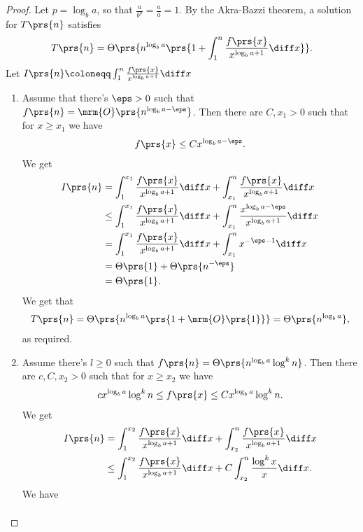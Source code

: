 \documentclass[oneside]{scrbook}
\theoremstyle{definition}
\begin{document}
\begin{exercise}
\begin{proof}
Let $p = \log_b a$, so that $\frac{a}{b^p} = \frac{a}{a} = 1$. By the Akra-Bazzi theorem, a solution for $T\prs{n}$ satisfies
\begin{align*}
T\prs{n} = \Theta\prs{n^{\log_b a} \prs{1 + \int_1^n \frac{f\prs{x}}{x^{\log_b a + 1}} \diff x}} \text{.}
\end{align*}
Let $I\prs{n} \coloneqq \int_1^n \frac{f\prs{x}}{x^{\log_b a + 1}} \diff x$
\begin{enumerate}
\item Assume that there's $\eps > 0$ such that $f\prs{n} = \mrm{O}\prs{n^{\log_b a - \eps}}$. Then there are $C, x_1 > 0$ such that for $x \geq x_1$ we have
\begin{align*}
f\prs{x} \leq C x^{\log_b a - \eps} \text{.}
\end{align*}
We get
\begin{align*}
I\prs{n} &= \int_1^{x_1} \frac{f\prs{x}}{x^{\log_b a + 1}} \diff x + \int_{x_1}^{n} \frac{f\prs{x}}{x^{\log_b a + 1}} \diff x
\\&\leq \int_1^{x_1} \frac{f\prs{x}}{x^{\log_b a + 1}} \diff x + \int_{x_1}^{n} \frac{x^{\log_b a - \eps}}{x^{\log_b a + 1}} \diff x
\\&= \int_1^{x_1} \frac{f\prs{x}}{x^{\log_b a + 1}} \diff x + \int_{x_1}^{n} x^{-\eps-1} \diff x
\\&= \Theta\prs{1} + \Theta\prs{n^{-\eps}}
\\&= \Theta\prs{1} \text{.}
\end{align*}
We get that
\begin{align*}
T\prs{n} = \Theta\prs{n^{\log_b a} \prs{1 + \mrm{O}\prs{1}}} = \Theta\prs{n^{\log_b a}} \text{,}
\end{align*}
as required.
\item
Assume there's $l \geq 0$ such that $f\prs{n} = \Theta\prs{n^{\log_ba} \log^k n}$.
Then there are $c, C, x_2 > 0$ such that for $x \geq x_2$ we have
\begin{align*}
c x^{\log_b a} \log^k n \leq f\prs{x} \leq C x^{\log_b a} \log^k n \text{.}
\end{align*}
We get
\begin{align*}
I\prs{n} &= \int_1^{x_2} \frac{f\prs{x}}{x^{\log_b a + 1}} \diff x + \int_{x_2}^{n} \frac{f\prs{x}}{x^{\log_b a + 1}} \diff x
\\&\leq \int_1^{x_2} \frac{f\prs{x}}{x^{\log_b a + 1}} \diff x + C \int_{x_2}^n \frac{\log^k x}{x} \diff x \text{.}
\end{align*}
We have
\begin{align*}

\end{align*}
\end{enumerate}
\end{proof}
\end{exercise}
\end{document}
